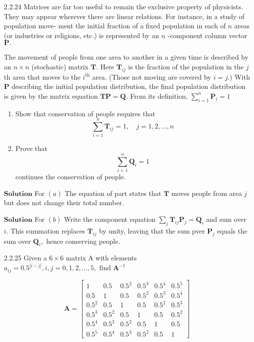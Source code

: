 \begin{mybox}{2.2.24}
Matrices are far too useful to remain the exclusive property of physicists. They may
appear wherever there are linear relations. For instance, in a study of population move-
ment the initial fraction of a fixed population in each of $n$ areas (or industries or
religions, etc.) is represented by an $n$ -component column vector $\mathbf{P} .$ 

The movement of people from one area to another in a given time is described by an $n \times n$ (stochastic) matrix $\mathbf{T}$. Here $\mathbf{T}_{i j}$ is the fraction of the population in the $j$ th area that moves to the $i^{\text{th}}$ area. (Those not moving are covered by $i=j.$) With $\mathbf{P}$ describing the initial population distribution, the final population distribution is given by the matrix equation $\mathbf{TP}=\mathbf{Q}$. From its definition, $\sum_{i=1}^{n} \mathbf{P}_{i}=1$

\begin{enumerate}[$(a)$]
\item Show that conservation of people requires that
$$
\sum_{i=1}^{n} \mathbf{T}_{i j}=1, \quad j=1,2, \ldots, n
$$
\item Prove that
$$
\sum_{i=1}^{n} \mathbf{Q}_{i}=1
$$
continues the conservation of people.
\end{enumerate}
\end{mybox}




$\boxed{\textbf{Solution}}$  For $(a)$ The equation of part states that $\mathbf{T}$ moves people from area $j$ but
does not change their total number. 



$\boxed{\textbf{Solution}}$ For $(b)$ Write the component equation $\sum_{j} \mathbf{T}_{i j} \mathbf{P}_{j}=\mathbf{Q}_{i}$ and sum over $i.$ This summation replaces $\mathbf{T}_{i j}$ by unity, leaving that the sum pver $\mathbf{P}_{j}$ equals the sum over $\mathbf{Q}_{i},$ hence conserving people.


\newpage

\begin{mybox}{2.2.25}
Given a $6 \times 6$ matrix A with elements $a_{i j}=0.5^{|i-j|}, i, j=0,1,2, \ldots, 5, \text { find } \mathbf{A}^{-1}$

$$\mathbf{A}=\begin{bmatrix}
1 & 0.5 & 0.5^2 & 0.5^3 & 0.5^4 & 0.5^5 \\ 
0.5 & 1 & 0.5 & 0.5^2 & 0.5^3 & 0.5^4 \\ 
0.5^2 & 0.5 & 1 & 0.5 & 0.5^2 & 0.5^3\\ 
0.5^3 & 0.5^2 & 0.5 & 1 & 0.5 & 0.5^2\\ 
0.5^4 & 0.5^3 & 0.5^2 & 0.5 & 1 & 0.5\\ 
0.5^5 & 0.5^4 & 0.5^3 & 0.5^2 & 0.5 & 1
\end{bmatrix}$$
\end{mybox}

